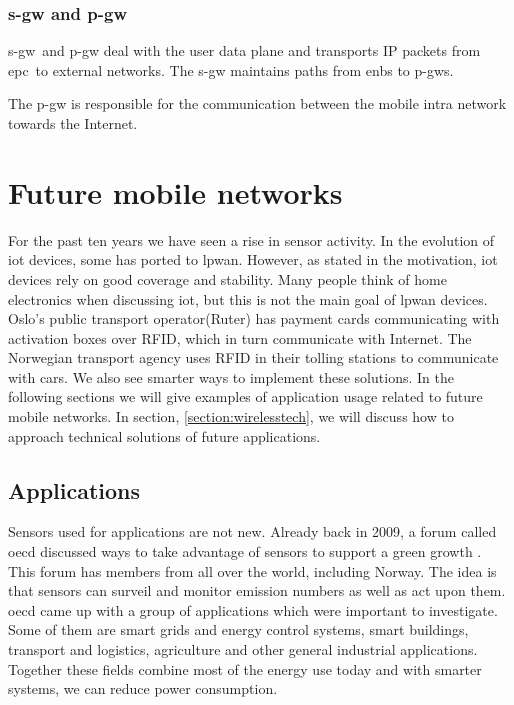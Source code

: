 \documentclass[USenglish]{ifimaster}  %
\begin{document}
\subsubsection{\acrshort{s-gw} and \acrshort{p-gw}}
\acrfull{s-gw} and \acrfull{p-gw} deal with the user data plane and transports IP packets from \acrshort{epc} to external networks. The \acrshort{s-gw} maintains paths from \acrshort{enb}s to \acrshort{p-gw}s.

The \acrshort{p-gw} is responsible for the communication between the mobile intra network towards the Internet.

\section{Future mobile networks} \label{section:futureapplications}
For the past ten years we have seen a rise in sensor activity. In the evolution of \acrshort{iot} devices, some has ported to \acrshort{lpwan}. However, as stated in the motivation, \acrshort{iot} devices rely on good coverage and stability. Many people think of home electronics when discussing \acrshort{iot}, but this is not the main goal of \acrshort{lpwan} devices. Oslo's public transport operator(Ruter) has payment cards communicating with activation boxes over RFID, which in turn communicate with Internet. The Norwegian transport agency uses RFID in their tolling stations to communicate with cars. We also see smarter ways to implement these solutions. In the following sections we will give examples of application usage related to future mobile networks. In section, \vref{section:wirelesstech}, we will discuss how to approach technical solutions of future applications.

\subsection{Applications} \label{ssection:applications}
Sensors used for applications are not new. Already back in 2009, a forum called \acrfull{oecd} discussed ways to take advantage of sensors to support a green growth \cite{online:industryApplications}. This forum has members from all over the world, including Norway. The idea is that sensors can surveil and monitor emission numbers as well as act upon them. \acrshort{oecd} came up with a group of applications which were important to investigate. Some of them are smart grids and energy control systems, smart buildings, transport and logistics, agriculture and other general industrial applications. Together these fields combine most of the energy use today and with smarter systems, we can reduce power consumption.
\end{document}
